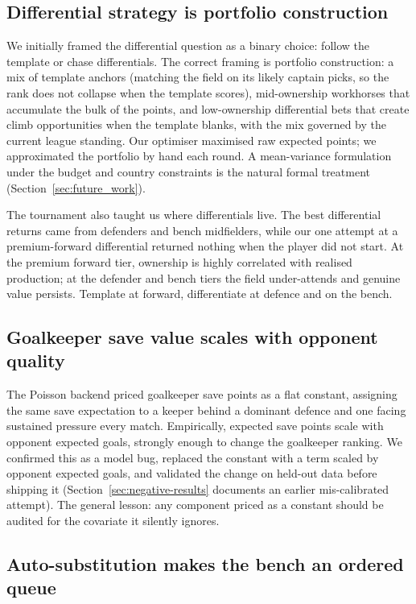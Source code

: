\subsection{Differential strategy is portfolio construction}
\label{sec:lessons-portfolio}

We initially framed the differential question as a binary choice:
follow the template or chase differentials. The correct framing is
portfolio construction: a mix of template anchors (matching the field
on its likely captain picks, so the rank does not collapse when the
template scores), mid-ownership workhorses that accumulate the bulk of
the points, and low-ownership differential bets that create climb
opportunities when the template blanks, with the mix governed by the
current league standing. Our optimiser maximised raw expected points;
we approximated the portfolio by hand each round. A mean-variance
formulation under the budget and country constraints is the natural
formal treatment (Section~\ref{sec:future_work}).

The tournament also taught us where differentials live. The best
differential returns came from defenders and bench midfielders, while
our one attempt at a premium-forward differential returned nothing
when the player did not start. At the premium forward tier, ownership
is highly correlated with realised production; at the defender and
bench tiers the field under-attends and genuine value persists.
Template at forward, differentiate at defence and on the bench.

\subsection{Goalkeeper save value scales with opponent quality}
\label{sec:lessons-gk}

The Poisson backend priced goalkeeper save points as a flat constant,
assigning the same save expectation to a keeper behind a dominant
defence and one facing sustained pressure every match. Empirically,
expected save points scale with opponent expected goals, strongly
enough to change the goalkeeper ranking. We confirmed this as a model
bug, replaced the constant with a term scaled by opponent expected
goals, and validated the change on held-out data before shipping it
(Section~\ref{sec:negative-results} documents an earlier
mis-calibrated attempt). The general lesson: any component priced as a
constant should be audited for the covariate it silently ignores.

\subsection{Auto-substitution makes the bench an ordered queue}
\label{sec:lessons-bench}


